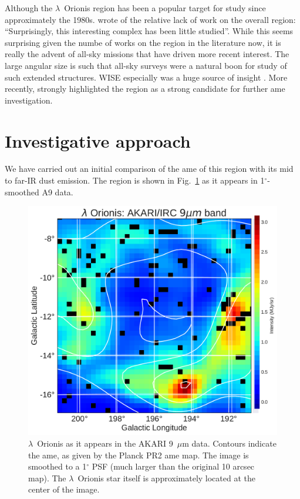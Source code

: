     Although the $\lambda$~Orionis region has been a popular target for study since approximately the 1980s. \cite{duerr82} wrote of the relative lack of work on the overall region: ``Surprisingly, this interesting complex has been little studied''. While this seems surprising given the numbe of works on the region in the literature now, it is really the advent of all-sky missions that have driven more recent interest.  The large angular size is such that all-sky surveys were a natural boon for study of such extended structures. WISE especially was a huge source of insight \citep{koenig15}. More recently, \cite{planck15XXV} strongly highlighted the region as a strong candidate for further \gls{ame} investigation.

\section{Investigative approach}
  We have carried out an initial comparison of the \gls{ame} of this region with its mid to far-IR dust emission. The region is shown in Fig.~\ref{fig:orionis-akari9} as it appears in 1$^{\circ}$-smoothed A9 data.
      \begin{figure}
        \includegraphics[width=\textwidth]{../Plots/LOri_akari9_AMEcont_1dres.pdf}
        \centering
        \caption{$\lambda$~Orionis as it appears in the AKARI 9~$\mu$m data. Contours indicate the \gls{ame}, as given by the Planck PR2 \gls{ame} map. The image is smoothed to a 1$^{\circ}$ PSF (much larger than the original 10 arcsec map). The $\lambda$~Orionis star itself is approximately located at the center of the image.}
        \label{fig:orionis-akari9}
      \end{figure}
